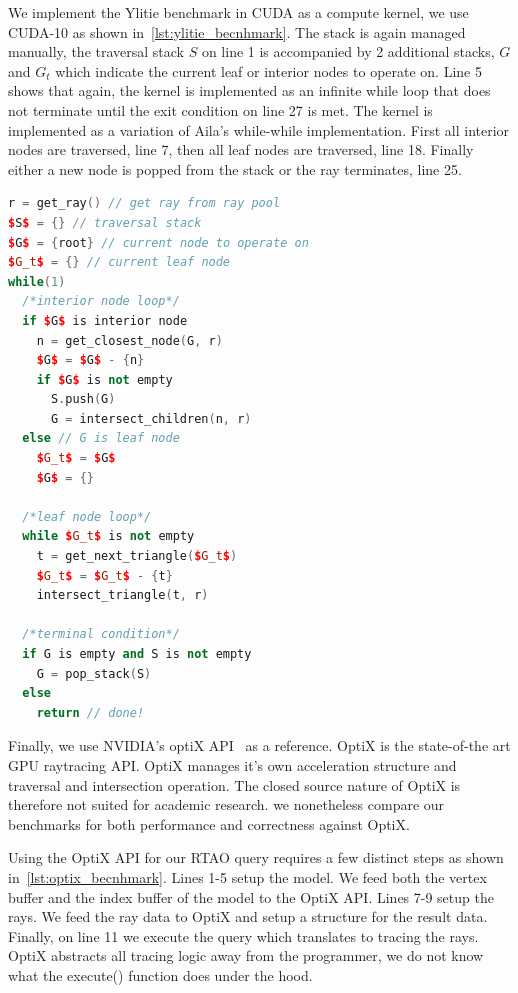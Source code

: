 We implement the Ylitie benchmark in CUDA as a compute kernel, we use CUDA-10 as shown in~\autoref{lst:ylitie_becnhmark}.
The stack is again managed manually, the traversal stack $S$ on line 1 is accompanied by 2 additional stacks, $G$ and $G_t$ which indicate the current leaf or interior nodes to operate on. Line 5 shows that again, the kernel is implemented as an infinite while loop that does not terminate until the exit condition on line 27 is met. 
The kernel is implemented as a variation of Aila's while-while implementation. First all interior nodes are traversed, line 7, then all leaf nodes are traversed, line 18. Finally either a new node is popped from the stack or the ray terminates, line 25.

\begin{lstlisting}[mathescape=true, caption={Ylitie et al.~\cite{Aila:2009:UER:1572769.1572792} GPU BVH traversal benchmark},label={lst:ylitie_becnhmark}, language=C++]
r = get_ray() // get ray from ray pool
$S$ = {} // traversal stack
$G$ = {root} // current node to operate on
$G_t$ = {} // current leaf node
while(1)
  /*interior node loop*/
  if $G$ is interior node
    n = get_closest_node(G, r)
    $G$ = $G$ - {n}
    if $G$ is not empty
      S.push(G)
      G = intersect_children(n, r)
  else // G is leaf node
    $G_t$ = $G$    
    $G$ = {}

  /*leaf node loop*/
  while $G_t$ is not empty
    t = get_next_triangle($G_t$)
    $G_t$ = $G_t$ - {t}
    intersect_triangle(t, r)

  /*terminal condition*/
  if G is empty and S is not empty
    G = pop_stack(S)
  else
    return // done!
\end{lstlisting}

Finally, we use NVIDIA's optiX API~\cite{Parker:2010:OGP:1778765.1778803} as a reference. OptiX is the state-of-the art GPU raytracing API. OptiX manages it's own acceleration structure and traversal and intersection operation. The closed source nature of OptiX is therefore not suited for academic research. we nonetheless compare our benchmarks for both performance and correctness against OptiX. 

Using the OptiX API for our RTAO query requires a few distinct steps as shown in~\autoref{lst:optix_becnhmark}. Lines 1-5 setup the model. We feed both the vertex buffer and the index buffer of the model to the OptiX API. Lines 7-9 setup the rays. We feed the ray data to OptiX and setup a structure for the result data. 
Finally, on line 11 we execute the query which translates to tracing the rays. OptiX abstracts all tracing logic away from the programmer, we do not know what the execute() function does under the hood. 

